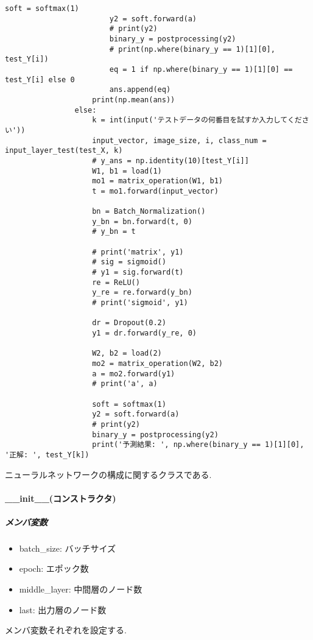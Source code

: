 \documentclass[a4j, titlepage]{jarticle}
\begin{document}
\begin{lstlisting}[caption=3層ニューラルネットワークの構成 ,label=fuga]
                        soft = softmax(1)
                        y2 = soft.forward(a)
                        # print(y2)
                        binary_y = postprocessing(y2)
                        # print(np.where(binary_y == 1)[1][0], test_Y[i])
                        eq = 1 if np.where(binary_y == 1)[1][0] == test_Y[i] else 0
                        ans.append(eq)
                    print(np.mean(ans))
                else:
                    k = int(input('テストデータの何番目を試すか入力してください'))
                    input_vector, image_size, i, class_num = input_layer_test(test_X, k)
                    # y_ans = np.identity(10)[test_Y[i]]
                    W1, b1 = load(1)
                    mo1 = matrix_operation(W1, b1)
                    t = mo1.forward(input_vector)

                    bn = Batch_Normalization()
                    y_bn = bn.forward(t, 0)
                    # y_bn = t

                    # print('matrix', y1)
                    # sig = sigmoid()
                    # y1 = sig.forward(t)
                    re = ReLU()
                    y_re = re.forward(y_bn)
                    # print('sigmoid', y1)

                    dr = Dropout(0.2)
                    y1 = dr.forward(y_re, 0)

                    W2, b2 = load(2)
                    mo2 = matrix_operation(W2, b2)
                    a = mo2.forward(y1)
                    # print('a', a)

                    soft = softmax(1)
                    y2 = soft.forward(a)
                    # print(y2)
                    binary_y = postprocessing(y2)
                    print('予測結果: ', np.where(binary_y == 1)[1][0], '正解: ', test_Y[k])
        \end{lstlisting}
        ニューラルネットワークの構成に関するクラスである.
        \paragraph*{\_\_init\_\_(コンストラクタ)}
            \subparagraph*{メンバ変数}
            \begin{itemize}
                \item batch\_size: バッチサイズ
                \item epoch: エポック数
                \item middle\_layer: 中間層のノード数
                \item last: 出力層のノード数
            \end{itemize}
            メンバ変数それぞれを設定する.
\end{document}

